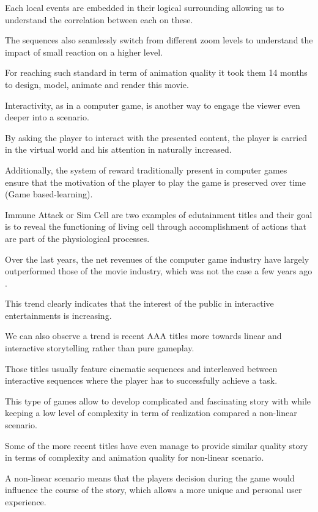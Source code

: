 Each local events are embedded in their logical surrounding allowing us to understand the correlation between each on these.

The sequences also seamlessly switch from different zoom levels to understand the impact of small reaction on a higher level.

For reaching such standard in term of animation quality it took them 14 months to design, model, animate and render this movie.


Interactivity, as in a computer game, is another way to engage the viewer even deeper into a scenario.

By asking the player to interact with the presented content, the player is carried in the virtual world and his attention in naturally increased. 

Additionally, the system of reward traditionally present in computer games ensure that the motivation of the player to play the game is preserved over time (Game based-learning).

Immune Attack or Sim Cell are two examples of edutainment titles and their goal is to reveal the functioning of living cell through accomplishment of actions that are part of the physiological processes.

Over the last years, the net revenues of the computer game industry have largely outperformed those of the movie industry, which was not the case a few years ago .

This trend clearly indicates that the interest of the public in interactive entertainments is increasing.

We can also observe a trend is recent AAA titles more towards linear and interactive storytelling rather than pure gameplay.

Those titles usually feature cinematic sequences and  interleaved between interactive sequences where the player has to successfully achieve a task.

This type of games allow to develop complicated and fascinating story with while keeping a low level of complexity in term of realization compared a non-linear scenario.

Some of the more recent titles have even manage to provide similar quality story in terms of complexity and animation quality for non-linear scenario.

A non-linear scenario means that the players decision during the game would influence the course of the story, which allows a more unique and personal user experience.

